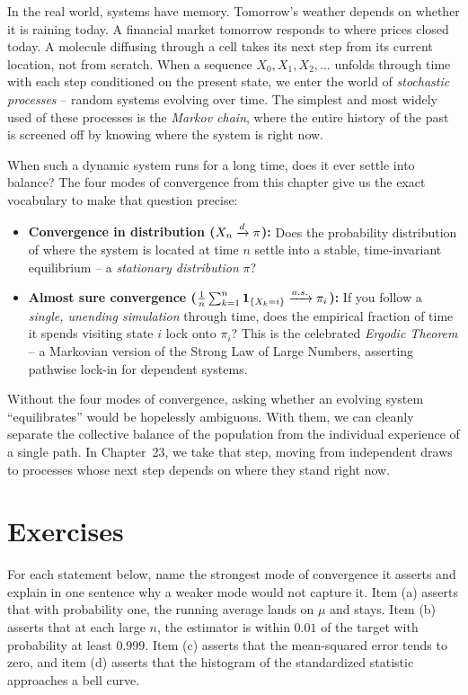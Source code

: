 In the real world, systems have memory.
Tomorrow's weather depends on whether it is raining today. A financial market
tomorrow responds to where prices closed today. A molecule diffusing through a cell
takes its next step from its current location, not from scratch. When a sequence
$X_0, X_1, X_2, \dots$ unfolds through time with each step conditioned on the
present state, we enter the world of \emph{stochastic processes} -- random systems
evolving over time. The simplest and most widely used of these
processes is the \emph{Markov chain}, where the entire history of the past is
screened off by knowing where the system is right now.

When such a dynamic system runs for a long time, does it ever settle into balance?
The four modes of convergence from this chapter give us the exact vocabulary
to make that question precise:
\begin{itemize}
  \item \textbf{Convergence in distribution ($X_n \xrightarrow{d} \pi$):} Does the probability
        distribution of where the system is located at time $n$ settle into a stable,
        time-invariant equilibrium -- a \emph{stationary distribution} $\pi$?
  \item \textbf{Almost sure convergence ($\frac{1}{n} \sum_{k=1}^n \mathbf{1}_{\{X_k=i\}} \xrightarrow{a.s.} \pi_i$):}
        If you follow a \emph{single, unending simulation} through time, does the
        empirical fraction of time it spends visiting state $i$ lock onto $\pi_i$?
        This is the celebrated \emph{Ergodic Theorem} -- a Markovian version of the
        Strong Law of Large Numbers, asserting pathwise lock-in for dependent systems.
\end{itemize}

Without the four modes of convergence, asking whether an evolving system ``equilibrates''
would be hopelessly ambiguous. With them, we can cleanly separate the collective
balance of the population from the individual experience of a single path.
In Chapter~23, we take that step, moving from independent draws to processes whose next
step depends on where they stand right now.

\section{Exercises}
\label{ch22:exercises}

\begin{exercise}
\label{ch22:exr-defs}
For each statement below, name the strongest mode of convergence it asserts and explain
in one sentence why a weaker mode would not capture it.
Item (a) asserts that with probability one, the running average lands on $\mu$ and stays.
Item (b) asserts that at each large $n$, the estimator is within $0.01$ of the target
with probability at least $0.999$.
Item (c) asserts that the mean-squared error tends to zero, and item (d) asserts that
the histogram of the standardized statistic approaches a bell curve.
\end{exercise}

